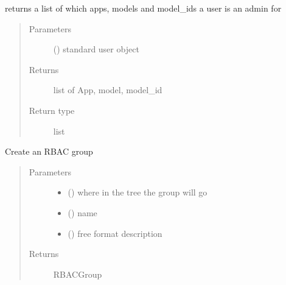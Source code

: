 \documentclass[letterpaper,10pt,english]{sphinxmanual}
\begin{document}
\begin{fulllineitems}
\label{\detokenize{rbac:rbac.core.rbac_admin_all_rights}}
returns a list of which apps, models and model\_ids a user is an admin for
\begin{quote}\begin{description}
\item[{Parameters}] \leavevmode
{} ({\hyperref[\detokenize{accounts:accounts.models.User}]{}}) \textendash{} standard user object

\item[{Returns}] \leavevmode
list of App, model, model\_id

\item[{Return type}] \leavevmode
list

\end{description}\end{quote}

\end{fulllineitems}


\begin{fulllineitems}
\label{\detokenize{rbac:rbac.core.rbac_create_group}}
Create an RBAC group
\begin{quote}\begin{description}
\item[{Parameters}] \leavevmode\begin{itemize}
\item {} 
 () \textendash{} where in the tree the group will go

\item {} 
 () \textendash{} name

\item {} 
 () \textendash{} free format description

\end{itemize}

\item[{Returns}] \leavevmode
RBACGroup

\end{description}\end{quote}

\end{fulllineitems}
\end{document}
